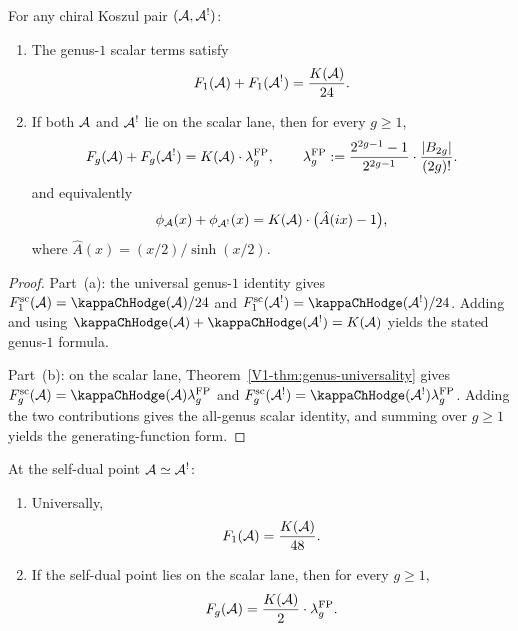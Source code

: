 \begin{theorem}
\label{thm:thqg-IV-free-energy}
For any chiral Koszul pair $(\mathcal{A}, \mathcal{A}^!)$:
\begin{enumerate}[label=\textup{(\alph*)}]
\item The genus-$1$ scalar terms satisfy
\begin{equation}%
F_1(\cA) + F_1(\cA^!)
= \frac{K(\cA)}{24}.
\end{equation}
\item If both $\mathcal{A}$ and $\mathcal{A}^!$ lie on the scalar lane,
then for every $g \geq 1$,
\begin{equation}%
F_g(\cA) + F_g(\cA^!)
= K(\cA) \cdot \lambda_g^{\mathrm{FP}},
\qquad
\lambda_g^{\mathrm{FP}}
:= \frac{2^{2g-1}-1}{2^{2g-1}} \cdot \frac{|B_{2g}|}{(2g)!}.
\end{equation}
and equivalently
\begin{equation}%
\phi_\cA(x) + \phi_{\cA^!}(x)
= K(\cA) \cdot \bigl(\hat{A}(ix) - 1\bigr),
\end{equation}
where $\hat{A}(x) = (x/2)/\sinh(x/2)$.
\end{enumerate}
\end{theorem}

\begin{proof}
Part~(a): the universal genus-$1$ identity gives
$F_1^{\mathrm{sc}}(\cA) = \kappaChHodge(\cA)/24$ and
$F_1^{\mathrm{sc}}(\cA^!) = \kappaChHodge(\cA^!)/24$.
Adding and using $\kappaChHodge(\cA) + \kappaChHodge(\cA^!) = K(\cA)$ yields the
stated genus-$1$ formula.

Part~(b): on the scalar lane,
Theorem~\ref{V1-thm:genus-universality} gives
$F_g^{\mathrm{sc}}(\cA)=\kappaChHodge(\cA)\lambda_g^{\mathrm{FP}}$ and
$F_g^{\mathrm{sc}}(\cA^!)=\kappaChHodge(\cA^!)\lambda_g^{\mathrm{FP}}$.
Adding the two contributions gives the all-genus scalar identity, and
summing over $g \geq 1$ yields the generating-function form.
\end{proof}

\begin{corollary}
At the self-dual point $\mathcal{A} \simeq \mathcal{A}^!$:
\begin{enumerate}[label=\textup{(\alph*)}]
\item Universally,
\[
 F_1(\mathcal{A}) = \frac{K(\mathcal{A})}{48}.
\]
\item If the self-dual point lies on the scalar lane,
then for every $g \geq 1$,
\[
 F_g(\mathcal{A}) = \frac{K(\mathcal{A})}{2} \cdot \lambda_g^{\mathrm{FP}}.
\]
\end{enumerate}
\end{corollary}

